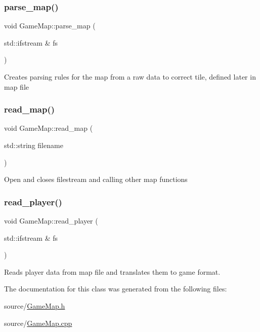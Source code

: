 \subsubsection{\texorpdfstring{parse\+\_\+map()}{parse\_map()}}
{\footnotesize\ttfamily void Game\+Map\+::parse\+\_\+map (\begin{DoxyParamCaption}\item[{std\+::ifstream \&}]{fs }\end{DoxyParamCaption})}

Creates parsing rules for the map from a raw data to correct tile, defined later in map file \mbox{\label{classGameMap_a6ae8d5ab0680b562a8807049cd52c52d}} 
\subsubsection{\texorpdfstring{read\+\_\+map()}{read\_map()}}
{\footnotesize\ttfamily void Game\+Map\+::read\+\_\+map (\begin{DoxyParamCaption}\item[{std\+::string}]{filename }\end{DoxyParamCaption})}

Open and closes filestream and calling other map functions \mbox{\label{classGameMap_a51eeccf4c1f0edac69dbd2a4d3a5e9e7}} 
\subsubsection{\texorpdfstring{read\+\_\+player()}{read\_player()}}
{\footnotesize\ttfamily void Game\+Map\+::read\+\_\+player (\begin{DoxyParamCaption}\item[{std\+::ifstream \&}]{fs }\end{DoxyParamCaption})}

Reads player data from map file and translates them to game format. 

The documentation for this class was generated from the following files\+:\begin{DoxyCompactItemize}
\item 
source/\hyperlink{GameMap_8h}{Game\+Map.\+h}\item 
source/\hyperlink{GameMap_8cpp}{Game\+Map.\+cpp}\end{DoxyCompactItemize}
